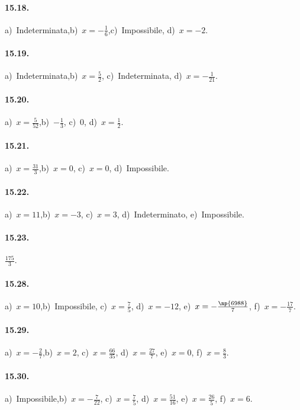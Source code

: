 \paragraph{15.18.}
a)~Indeterminata,\quad b)~$x=-\frac{1}{6}$,\quad c)~Impossibile, \quad d)~$x=-2$.

\paragraph{15.19.}
a)~Indeterminata,\quad b)~$x=\frac{5}{2}$, \quad c)~Indeterminata, \quad d)~$x=-\frac{1}{21}$.

\paragraph{15.20.}
a)~$x=\frac{5}{52}$,\quad b)~$-\frac{1}{3}$, \quad c)~$0$, \quad d)~$x=\frac{1}{2}$.

\paragraph{15.21.}
a)~$x=\frac{31}{3}$,\quad b)~$x=0$, \quad c)~$x=0$, \quad d)~Impossibile.

\paragraph{15.22.}
a)~$x=11$,\quad b)~$x=-3$, \quad c)~$x=3$, \quad d)~Indeterminato, \quad e)~Impossibile.

\paragraph{15.23.}
$\frac{175}{3}$.

\paragraph{15.28.}
a)~$x=10$,\quad b)~Impossibile, \quad c)~$x=\frac{7}{5}$, \quad d)~$x=-12$, \quad e)~$x=-\frac{\np{6988}}{7}$, \quad f)~$x=-\frac{17}{7}$.

\paragraph{15.29.}
a)~$x=-{\frac{2}{7}}$,\quad b)~$x=2$, \quad c)~$x=\frac{66}{35}$, \quad d)~$x=\frac{27}{7}$, \quad e)~$x=0$, \quad f)~$x=\frac{8}{3}$.

\paragraph{15.30.}
a)~Impossibile,\quad b)~$x=-{\frac{7}{22}}$, \quad c)~$x=\frac{7}{5}$, \quad d)~$x=\frac{51}{16}$, \quad e)~$x=\frac{26}{5}$, \quad f)~$x=6$.

